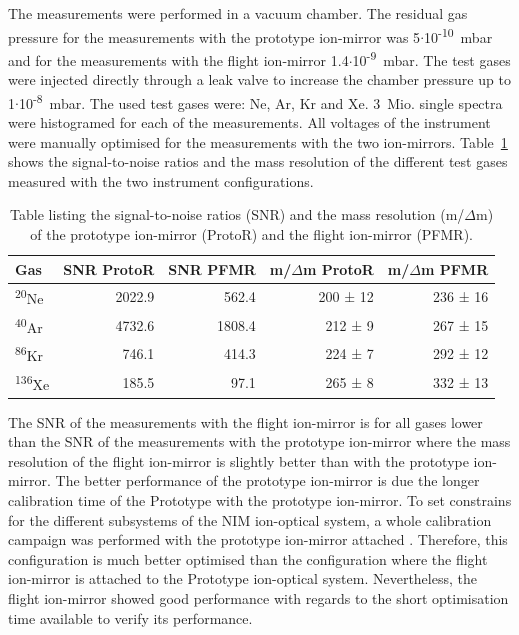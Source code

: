 	The measurements were performed in a vacuum chamber. The residual gas pressure for the measurements with the prototype ion-mirror was 5$\cdot$10\textsuperscript{-10}~mbar and for the measurements with the flight ion-mirror 1.4$\cdot$10\textsuperscript{-9}~mbar. The test gases were injected directly through a leak valve to increase the chamber pressure up to 1$\cdot$10\textsuperscript{-8}~mbar. The used test gases were: Ne, Ar, Kr and Xe. 3~Mio. single spectra were histogramed for each of the measurements. All voltages of the instrument were manually optimised for the measurements with the two ion-mirrors. Table~\ref{tab:refPerftab} shows the signal-to-noise ratios and the mass resolution of the different test gases measured with the two instrument configurations.\\
	\begin{table}
		\begin{center}
		\begin{tabular}{|l|r|r|r|r|}
			\hline
			Gas						&SNR ProtoR	&SNR PFMR	&m/$\Delta$m ProtoR	&m/$\Delta$m PFMR\\
			\hline
			\textsuperscript{20}Ne	&2022.9		&562.4		&200 ± 12		&236 ± 16\\
			\textsuperscript{40}Ar	&4732.6		&1808.4		&212 ±  9		&267 ± 15\\
			\textsuperscript{86}Kr	&746.1		&414.3		&224 ±  7		&292 ± 12\\
			\textsuperscript{136}Xe	&185.5		&97.1		&265 ±  8		&332 ± 13\\
			\hline
		\end{tabular}
		\end{center}
		\caption{Table listing the signal-to-noise ratios (SNR) and the mass resolution (m/$\Delta$m) of the prototype ion-mirror (ProtoR) and the flight ion-mirror (PFMR).}
		\label{tab:refPerftab}
	\end{table}
	The SNR of the measurements with the flight ion-mirror is for all gases lower than the SNR of the measurements with the prototype ion-mirror where the mass resolution of the flight ion-mirror is slightly better than with the prototype ion-mirror. The better performance of the prototype ion-mirror is due the longer calibration time of the Prototype with the prototype ion-mirror. To set constrains for the different subsystems of the NIM ion-optical system, a whole calibration campaign was performed with the prototype ion-mirror attached \cite{Diss_Meyer}. Therefore, this configuration is much better optimised than the configuration where the flight ion-mirror is attached to the Prototype ion-optical system. Nevertheless, the flight ion-mirror showed good performance with regards to the short optimisation time available to verify its performance.
	
